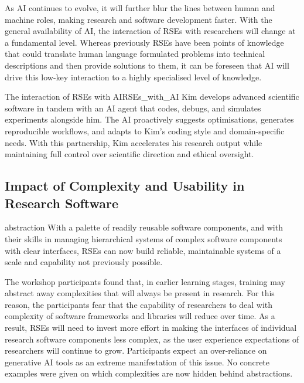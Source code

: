 \documentclass{eceasst}
\begin{document}
As AI continues to evolve, it will further blur the lines between human and machine roles, making research and software development faster.
With the general availability of AI, the interaction of RSEs with researchers will change at a fundamental level.
Whereas previously RSEs have been points of knowledge that could translate human language formulated problems into technical descriptions and then provide solutions to them,
it can be foreseen that AI will drive this low-key interaction to a highly specialised level of knowledge.

\begin{story}{The interaction of RSEs with AI}{RSEs_with_AI}
Kim develops advanced scientific software in tandem with an AI agent that codes, debugs, and simulates experiments alongside him. The AI proactively suggests optimisations, generates reproducible workflows, and adapts to Kim’s coding style and domain-specific needs. With this partnership, Kim accelerates his research output while maintaining full control over scientific direction and ethical oversight.
\end{story}

\subsection{Impact of Complexity and Usability in Research Software}
\begin{whatis}{}{abstraction}
With a palette of readily reusable software components,
and with their skills in managing hierarchical systems of complex software components with clear interfaces,
RSEs can now build reliable, maintainable systems of a scale and capability not previously possible.
\end{whatis}

The workshop participants found that, in earlier learning stages,
training may abstract away complexities that will always be present in research.
For this reason, the participants fear that the capability of researchers to deal with complexity
of software frameworks and libraries will reduce over time.
As a result, RSEs will need to invest more effort in making the interfaces of individual research software components
less complex, as the user experience expectations of researchers will continue to grow.
Participants expect an over-reliance on generative AI tools as an extreme manifestation of this issue.
No concrete examples were given on which complexities are now hidden behind abstractions.
\end{document}
